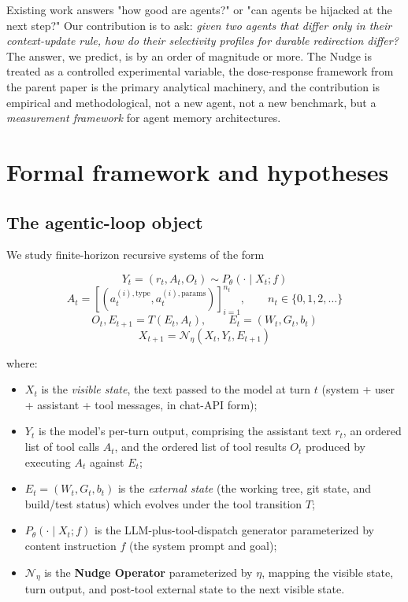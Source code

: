 \documentclass{article}
\theoremstyle{plain}
\theoremstyle{definition}
\begin{document}
Existing work answers "how good are agents?" or "can agents be hijacked at the next step?" Our contribution is to ask: \textit{given two agents that differ only in their context-update rule, how do their selectivity profiles for durable redirection differ?} The answer, we predict, is by an order of magnitude or more. The Nudge is treated as a controlled experimental variable, the dose-response framework from the parent paper is the primary analytical machinery, and the contribution is empirical and methodological, not a new agent, not a new benchmark, but a \textit{measurement framework} for agent memory architectures.


\section{Formal framework and hypotheses}

\subsection{The agentic-loop object}

We study finite-horizon recursive systems of the form

\begin{equation*}
Y_t = (r_t, A_t, O_t) \sim P_\theta(\cdot \mid X_t; f)
\end{equation*}
\begin{equation*}
A_t = [(a_t^{(i),\text{type}}, a_t^{(i),\text{params}})]_{i=1}^{n_t}, \qquad n_t \in \{0, 1, 2, \ldots\}
\end{equation*}
\begin{equation*}
O_t, E_{t+1} = T(E_t, A_t), \qquad E_t = (W_t, G_t, b_t)
\end{equation*}
\begin{equation*}
X_{t+1} = \mathcal{N}_\eta(X_t, Y_t, E_{t+1})
\end{equation*}

where:

\begin{itemize}
  \item $X_t$ is the \textit{visible state}, the text passed to the model at turn $t$ (system + user + assistant + tool messages, in chat-API form);
  \item $Y_t$ is the model's per-turn output, comprising the assistant text $r_t$, an ordered list of tool calls $A_t$, and the ordered list of tool results $O_t$ produced by executing $A_t$ against $E_t$;
  \item $E_t = (W_t, G_t, b_t)$ is the \textit{external state} (the working tree, git state, and build/test status) which evolves under the tool transition $T$;
  \item $P_\theta(\cdot \mid X_t; f)$ is the LLM-plus-tool-dispatch generator parameterized by content instruction $f$ (the system prompt and goal);
  \item $\mathcal{N}_\eta$ is the \textbf{Nudge Operator} parameterized by $\eta$, mapping the visible state, turn output, and post-tool external state to the next visible state.
\end{itemize}
\end{document}
